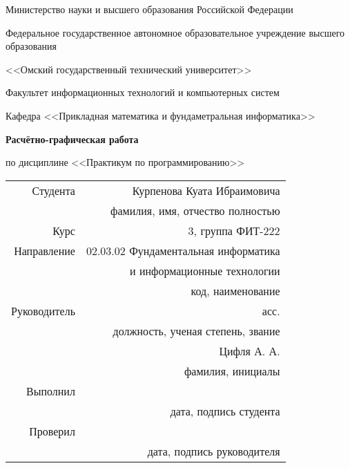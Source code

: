 \documentclass[a4paper]{article}
\begin{document}
    \thispagestyle{empty}

    \begin{center}
        Министерство науки и высшего образования Российской Федерации

        Федеральное государственное автономное образовательное учреждение высшего образования

        <<Омский государственный технический университет>>

        \vspace{1cm}
        Факультет информационных технологий и компьютерных систем

        Кафедра <<Прикладная математика и фундаметральная информатика>>

        \vspace{3cm}
        \textbf{Расчётно-графическая работа}

        по дисциплине <<Практикум по программированию>>
    \end{center}

    \vspace{3cm}
    \begin{flushright}    
        \begin{tabular}{ r r }
            Студента & Курпенова Куата Ибраимовича \\
            \cline{2-2}
            & \tiny{фамилия, имя, отчество полностью} \\

            Курс & 3, группа ФИТ-222 \\
            \cline{2-2}
            Направление & 02.03.02 Фундаментальная информатика\\
            \cline{2-2}
            & и информационные технологии\\
            \cline{2-2}
            & \tiny{код, наименование} \\

            Руководитель & асс. \\
            \cline{2-2}
            & \tiny{должность, ученая степень, звание} \\
            & Цифля А. А. \\
            \cline{2-2}
            & \tiny{фамилия, инициалы} \\

            Выполнил & \\
            \cline{2-2}
            & \tiny{дата, подпись студента} \\

            Проверил & \\
            \cline{2-2}
            & \tiny{дата, подпись руководителя} \\

        \end{tabular}
    \end{flushright}
\end{document}
